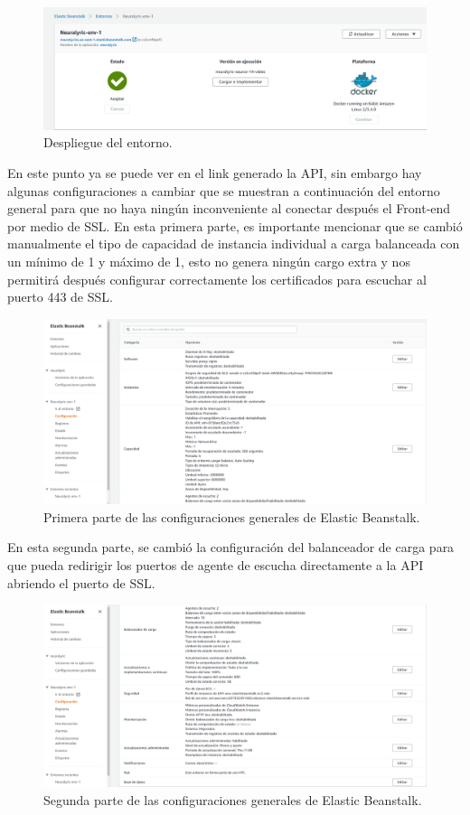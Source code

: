 \documentclass[12pt, a4paper, titlepage]{article}
\begin{document}
		\begin{figure}[H]
			\includegraphics[width=12cm]{./Imagenes/BackEnd/paso_5.png}
			\centering 
			\caption{Despliegue del entorno.}
		\end{figure}
		En este punto ya se puede ver en el link generado la API, sin embargo hay algunas configuraciones a cambiar que se muestran a continuación del entorno general para que no haya ningún inconveniente al conectar después el Front-end por medio de SSL.
		En esta primera parte, es importante mencionar que se cambió manualmente el tipo de capacidad de instancia individual a carga balanceada con un mínimo de 1 y máximo de 1, esto no genera ningún cargo extra y nos permitirá después configurar correctamente los certificados para escuchar al puerto 443 de SSL.
		\begin{figure}[H]
			\includegraphics[width=12cm]{./Imagenes/BackEnd/config_1.png}
			\centering 
			\caption{Primera parte de las configuraciones generales de Elastic Beanstalk.}
		\end{figure}
		En esta segunda parte, se cambió la configuración del balanceador de carga para que pueda redirigir los puertos de agente de escucha directamente a la API abriendo el puerto de SSL.
		\begin{figure}[H]
			\includegraphics[width=12cm]{./Imagenes/BackEnd/config_2.png}
			\centering 
			\caption{Segunda parte de las configuraciones generales de Elastic Beanstalk.}
		\end{figure}
\end{document}

